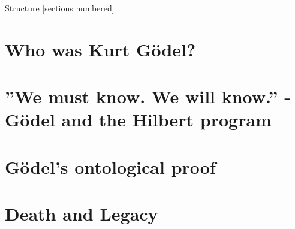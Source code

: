 \documentclass[10pt]{beamer}
\begin{document}
\begin{frame}
  \begin{figure}
  \end{figure}
\end{frame}

\maketitle


\begin{frame}[fragile]{Structure}
  [sections numbered]
  \tableofcontents
\end{frame}

\section{Who was Kurt Gödel?}

\section{''We must know. We will know.'' - Gödel and the Hilbert program}%


\section{Gödel's ontological proof}


\section{Death and Legacy}


\end{document}
